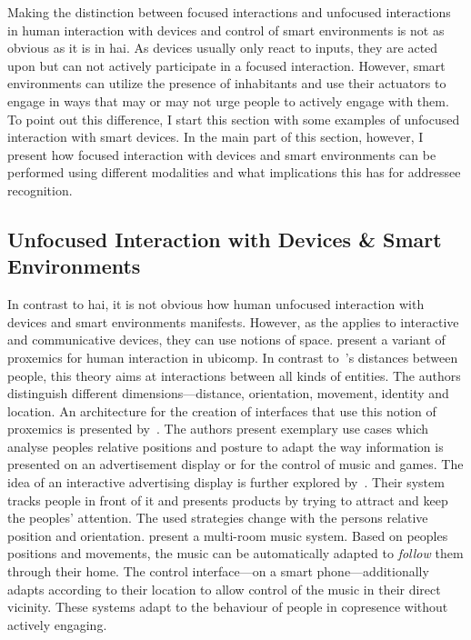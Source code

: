 Making the distinction between \glspl{focused interaction} and \glspl{unfocused interaction} in human interaction with \glspl{device} and control of \glspl{smart environment} is not as obvious as it is in \gls{hai}.
As devices usually only react to inputs, they are acted upon but can not actively participate in a \gls{focused interaction}.
However, \glspl{smart environment} can utilize the presence of inhabitants and use their actuators to engage in ways that may or may not urge people to actively engage with them.
To point out this difference, I start this section with some examples of \gls{unfocused interaction} with smart devices.
In the main part of this section, however, I present how \gls{focused interaction} with \glspl{device} and \glspl{smart environment} can be performed using different modalities and what implications this has for \gls{addressee} recognition.

\subsection[Unfocused Interaction]{Unfocused Interaction with Devices \& Smart Environments}\label{sec.rw.hi.unfocused-dev-rw}
In contrast to \gls{hai}, it is not obvious how human \gls{unfocused interaction} with \glspl{device} and \glspl{smart environment} manifests.
However, as the  applies to interactive and communicative \glspl{device}, they can use notions of space.
 present a variant of \gls{proxemics} for human interaction in \gls{ubicomp}.
In contrast to~\citeauthor*{Hall1969}'s distances between people, this theory aims at interactions between all kinds of entities.
The authors distinguish different dimensions---distance, orientation, movement, identity and location.
An architecture for the creation of interfaces that use this notion of \gls{proxemics} is presented by~.
The authors present exemplary use cases which analyse peoples relative positions and posture to adapt the way information is presented on an advertisement display or for the control of music and games.
The idea of an interactive advertising display is further explored by~.
Their system tracks people in front of it and presents products by trying to attract and keep the peoples' attention.
The used strategies change with the persons relative position and orientation.
 present a multi-room music system.
Based on peoples positions and movements, the music can be automatically adapted to \emph{follow} them through their home.
The control interface---on a smart phone---additionally adapts according to their location to allow control of the music in their direct vicinity.
These systems adapt to the behaviour of people in \gls{copresence} without actively engaging.

